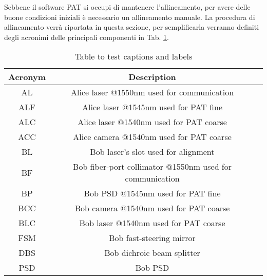 Sebbene il software PAT si occupi di mantenere l'allineamento, per avere delle buone condizioni iniziali è necessario un allineamento manuale. La procedura di allineamento verrà riportata in questa sezione, per semplificarla verranno definiti degli acronimi delle principali componenti in Tab. \ref{table:1}.

\begin{table}[h!]
  \centering
  \begin{tabular}{ |c|c|c| }
    \hline
    Acronym & Description                                              \\
    \hline
    AL      & Alice laser @1550nm used for communication               \\
    ALF     & Alice laser @1545nm used for PAT fine                    \\
    ALC     & Alice laser @1540nm used for PAT coarse                  \\
    ACC     & Alice camera @1540nm used for PAT coarse                 \\
    \hline
    BL      & Bob laser's slot used for alignment                      \\
    BF      & Bob fiber-port collimator @1550nm used for communication \\
    BP      & Bob PSD @1545nm used for PAT fine                        \\
    BCC     & Bob camera @1540nm used for PAT coarse                   \\
    BLC     & Bob laser @1540nm used for PAT coarse                    \\
    FSM     & Bob fast-steering mirror                                 \\
    DBS     & Bob dichroic beam splitter                               \\
    PSD     & Bob PSD                                                  \\
    \hline
  \end{tabular}
  \caption{Table to test captions and labels}
  \label{table:1}
\end{table}

